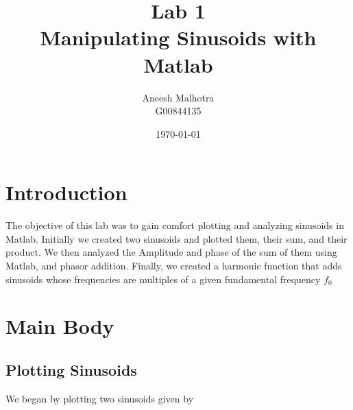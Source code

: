 \documentclass{article}
\title{Lab 1 \\ Manipulating Sinusoids with Matlab} %
\author{Aneesh Malhotra \\ G00844135} %
\date{\today} %
\begin{document}
\maketitle %




\section{Introduction}

The objective of this lab was to gain comfort plotting and analyzing sinusoids in Matlab. Initially we created two sinusoids and plotted them, their sum, and their product. We then analyzed the Amplitude and phase of the sum of them using Matlab, and phasor addition. Finally, we created a harmonic function that adds sinusoids whose frequencies are multiples of a given fundamental frequency $f_0$ 




\section{Main Body}

\subsection{Plotting Sinusoids}

We began by plotting two sinusoids given by 
\end{document}

